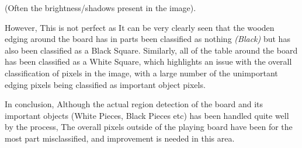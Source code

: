 \documentclass[11pt]{article}
\begin{document}
    (Often the brightness/shadows present in the image).
    \par
    However, This is not perfect as It can be very clearly seen that the wooden edging around the  board has in parts been classified as nothing \emph{(Black)} but has also been classified as a Black Square. Similarly, all of the table
    around the board has been classified as a White Square, which highlights an issue with the overall classification of pixels in the image, with a large number of the unimportant edging pixels being classified as important object pixels.
    \par
    In conclusion, Although the actual region detection of the board and its important objects (White Pieces, Black Pieces etc) has been handled quite well by the process, The overall pixels outside of the playing board have been 
    for the most part misclassified, and improvement is needed in this area.

    \newpage
\end{document}
